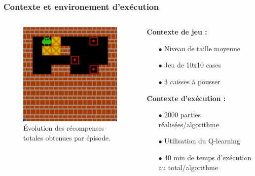 \documentclass[
	11pt, %
]{beamer}
\begin{document}
\begin{frame}
    \frametitle{Contexte et environement d'exécution}
    \begin{columns}
        \begin{column}{0.4\textwidth}
            \begin{figure}
                \centering
                \includegraphics[width=\textwidth]{Images/imagejeux.png}
                \caption{Évolution des récompenses totales obtenues par épisode.}
            \end{figure}
        \end{column}
        \begin{column}{0.4\textwidth}
            \textbf{Contexte de jeu :}\\
            \begin{itemize}
                \item[$\bullet$] Niveau de taille moyenne
                \item[$\bullet$] Jeu de 10x10 cases
                \item[$\bullet$] 3 caisses à pousser
            \end{itemize}
            \vspace{0.5cm}
            \textbf{Contexte d'exécution :}\\
            \begin{itemize}
                \item[$\bullet$] 2000 parties réalisées/algorithme
                \item[$\bullet$] Utilisation du Q-learning 
                \item[$\bullet$] 40 min de temps d'exécution au total/algorithme
            \end{itemize}
        \end{column}
    \end{columns}
\end{frame}
\end{document}
